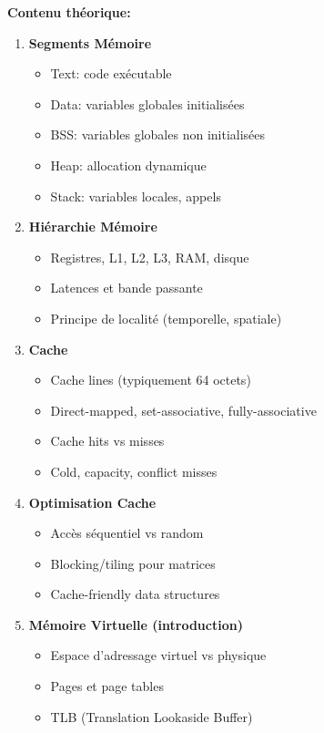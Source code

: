 \documentclass[10pt,a4paper]{article}
\begin{document}
\textbf{Contenu théorique:}
\begin{enumerate}
\item \textbf{Segments Mémoire}
   \begin{itemize}
   \item Text: code exécutable
   \item Data: variables globales initialisées
   \item BSS: variables globales non initialisées
   \item Heap: allocation dynamique
   \item Stack: variables locales, appels
   \end{itemize}

\item \textbf{Hiérarchie Mémoire}
   \begin{itemize}
   \item Registres, L1, L2, L3, RAM, disque
   \item Latences et bande passante
   \item Principe de localité (temporelle, spatiale)
   \end{itemize}

\item \textbf{Cache}
   \begin{itemize}
   \item Cache lines (typiquement 64 octets)
   \item Direct-mapped, set-associative, fully-associative
   \item Cache hits vs misses
   \item Cold, capacity, conflict misses
   \end{itemize}

\item \textbf{Optimisation Cache}
   \begin{itemize}
   \item Accès séquentiel vs random
   \item Blocking/tiling pour matrices
   \item Cache-friendly data structures
   \end{itemize}

\item \textbf{Mémoire Virtuelle (introduction)}
   \begin{itemize}
   \item Espace d'adressage virtuel vs physique
   \item Pages et page tables
   \item TLB (Translation Lookaside Buffer)
   \end{itemize}
\end{enumerate}
\end{document}
